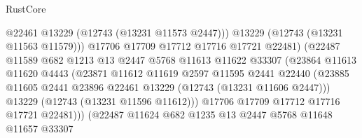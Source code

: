 \begin{lexlean}{RustCore}
\begin{coremodule}
                                        @22461
                                        @13229
                                        (@12743 (@13231 @11573 @2447)))
                                      @13229
                                      (@12743 (@13231 @11563 @11579)))
                                    @17706
                                    @17709
                                    @17712
                                    @17716
                                    @17721
                                    @22481)
                                  (@22487
                                    @11589
                                    @682
                                    @1213
                                    @13
                                    @2447
                                    @5768
                                    @11613
                                    @11622
                                    @33307
                                    (@23864
                                      @11613
                                      @11620
                                      @4443
                                      (@23871
                                        @11612
                                        @11619
                                        @2597
                                        @11595
                                        @2441
                                        @22440
                                        (@23885
                                          @11605
                                          @2441
                                          @23896
                                          @22461
                                          @13229
                                          (@12743 (@13231 @11606 @2447)))
                                        @13229
                                        (@12743 (@13231 @11596 @11612)))
                                      @17706
                                      @17709
                                      @17712
                                      @17716
                                      @17721
                                      @22481)))
                                (@22487
                                  @11624
                                  @682
                                  @1235
                                  @13
                                  @2447
                                  @5768
                                  @11648
                                  @11657
                                  @33307

\end{coremodule}
\end{lexlean}
